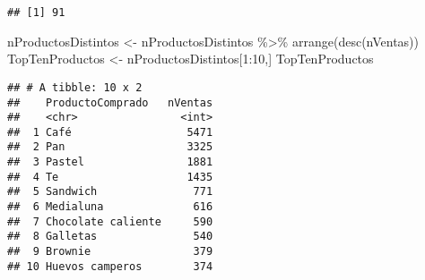 \documentclass[
]{book}
\newenvironment{Shaded}{\begin{snugshade}}{\end{snugshade}}
\newcommand{\DecValTok}[1]{\textcolor[rgb]{0.00,0.00,0.81}{#1}}
\newcommand{\FunctionTok}[1]{\textcolor[rgb]{0.00,0.00,0.00}{#1}}
\newcommand{\NormalTok}[1]{#1}
\newcommand{\OtherTok}[1]{\textcolor[rgb]{0.56,0.35,0.01}{#1}}
\newcommand{\SpecialCharTok}[1]{\textcolor[rgb]{0.00,0.00,0.00}{#1}}
\begin{document}
\begin{verbatim}
## [1] 91
\end{verbatim}

\begin{Shaded}
\begin{Highlighting}[]
\NormalTok{nProductosDistintos }\OtherTok{\textless{}{-}}\NormalTok{ nProductosDistintos }\SpecialCharTok{\%\textgreater{}\%} \FunctionTok{arrange}\NormalTok{(}\FunctionTok{desc}\NormalTok{(nVentas))}
\NormalTok{TopTenProductos }\OtherTok{\textless{}{-}}\NormalTok{ nProductosDistintos[}\DecValTok{1}\SpecialCharTok{:}\DecValTok{10}\NormalTok{,]}
\NormalTok{TopTenProductos}
\end{Highlighting}
\end{Shaded}

\begin{verbatim}
## # A tibble: 10 x 2
##    ProductoComprado   nVentas
##    <chr>                <int>
##  1 Café                  5471
##  2 Pan                   3325
##  3 Pastel                1881
##  4 Te                    1435
##  5 Sandwich               771
##  6 Medialuna              616
##  7 Chocolate caliente     590
##  8 Galletas               540
##  9 Brownie                379
## 10 Huevos camperos        374
\end{verbatim}
\end{document}
